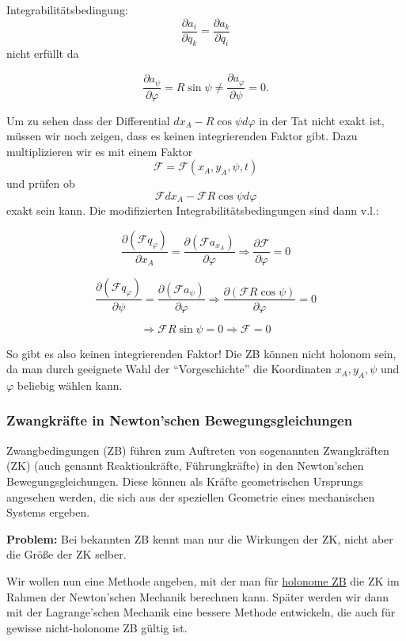 \documentclass[10pt, letterpaper]{article}
\begin{document}
Integrabilitätsbedingung: \[\frac{\partial a_i}{\partial q_k} = \frac{\partial a_k}{\partial q_i}\] nicht erfüllt da

\[\frac{\partial a_\psi}{\partial \varphi} = R \sin\psi \neq \frac{\partial a_\varphi}{\partial \psi} = 0.\]

Um zu sehen dass der Differential $dx_A - R\cos\psi d\varphi$ in der Tat nicht exakt ist, müssen wir noch zeigen, dass es keinen integrierenden Faktor gibt. Dazu multiplizieren wir es mit einem Faktor \[\mathcal{F} = \mathcal{F}(x_A, y_A, \psi, t)\] und prüfen ob \[\mathcal{F} dx_A - \mathcal{F}R\cos\psi d\varphi\] exakt sein kann. Die modifizierten Integrabilitätsbedingungen sind dann v.l.:

\[\frac{\partial(\mathcal{F}q_\varphi)}{\partial x_A} = \frac{\partial(\mathcal{F}a_{x_A})}{\partial \varphi} \Rightarrow \frac{\partial \mathcal{F}}{\partial \varphi} = 0\]

\[\frac{\partial(\mathcal{F}q_\varphi)}{\partial \psi} = \frac{\partial(\mathcal{F}a_\psi)}{\partial \varphi} \Rightarrow \frac{\partial(\mathcal{F}R\cos\psi)}{\partial \varphi} = 0\]

\[\Rightarrow \mathcal{F}R\sin\psi = 0 \Rightarrow \mathcal{F} = 0\]

So gibt es also keinen integrierenden Faktor! Die ZB können nicht holonom sein, da man durch geeignete Wahl der ``Vorgeschichte'' die Koordinaten $x_A, y_A, \psi$ und $\varphi$ beliebig wählen kann.


\subsubsection{Zwangkräfte in Newton'schen Bewegungsgleichungen}

Zwangbedingungen (ZB) führen zum Auftreten von sogenannten Zwangkräften (ZK) (auch genannt Reaktionkräfte, Führungkräfte) in den Newton'schen Bewegungsgleichungen. Diese können als Kräfte geometrischen Ursprungs angesehen werden, die sich aus der speziellen Geometrie eines mechanischen Systems ergeben.

\textbf{Problem:} Bei bekannten ZB kennt man nur die Wirkungen der ZK, nicht aber die Größe der ZK selber.

Wir wollen nun eine Methode angeben, mit der man für \underline{holonome ZB} die ZK im Rahmen der Newton'schen Mechanik berechnen kann. Später werden wir dann mit der Lagrange'schen Mechanik eine bessere Methode entwickeln, die auch für gewisse nicht-holonome ZB gültig ist.
\end{document}
